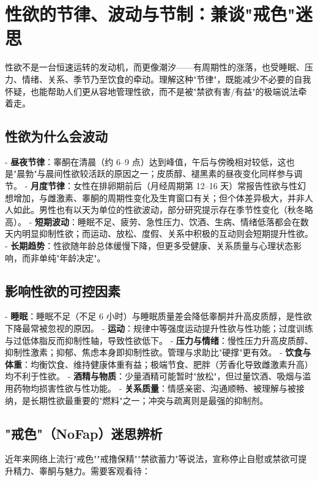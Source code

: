 \section{性欲的节律、波动与节制：兼谈"戒色"迷思}

性欲不是一台恒速运转的发动机，而更像潮汐——有周期性的涨落，也受睡眠、压力、情绪、关系、季节乃至饮食的牵动。理解这种"节律"，既能减少不必要的自我怀疑，也能帮助人们更从容地管理性欲，而不是被"禁欲有害/有益"的极端说法牵着走。

\subsection{性欲为什么会波动}

- \textbf{昼夜节律}：睾酮在清晨（约 6--9 点）达到峰值，午后与傍晚相对较低，这也是"晨勃"与晨间性欲较活跃的原因之一；皮质醇、褪黑素的昼夜变化同样参与调节。
- \textbf{月度节律}：女性在排卵期前后（月经周期第 12--16 天）常报告性欲与性幻想增加，与雌激素、睾酮的周期性变化及生育窗口有关；但个体差异极大，并非人人如此。男性也有以天为单位的性欲波动，部分研究提示存在季节性变化（秋冬略高）。
- \textbf{短期波动}：睡眠不足、疲劳、急性压力、饮酒、生病、情绪低落都会在数天内明显抑制性欲；而运动、放松、度假、关系中积极的互动则会短期提升性欲。
- \textbf{长期趋势}：性欲随年龄总体缓慢下降，但更多受健康、关系质量与心理状态影响，而非单纯"年龄决定"。

\subsection{影响性欲的可控因素}

- \textbf{睡眠}：睡眠不足（不足 6 小时）与睡眠质量差会降低睾酮并升高皮质醇，是性欲下降最常被忽视的原因。
- \textbf{运动}：规律中等强度运动提升性欲与性功能；过度训练与过低体脂反而抑制性轴，导致性欲低下。
- \textbf{压力与情绪}：慢性压力升高皮质醇、抑制性激素；抑郁、焦虑本身即抑制性欲。管理与求助比"硬撑"更有效。
- \textbf{饮食与体重}：均衡饮食、维持健康体重有益；极端节食、肥胖（芳香化导致雌激素升高）均不利于性欲。
- \textbf{酒精与物质}：少量酒精可能暂时"放松"，但过量饮酒、吸烟与滥用药物均损害性欲与性功能。
- \textbf{关系质量}：情感亲密、沟通顺畅、被理解与被接纳，是长期性欲最重要的"燃料"之一；冲突与疏离则是最强的抑制剂。

\subsection{"戒色"（NoFap）迷思辨析}

近年来网络上流行"戒色""戒撸保精""禁欲蓄力"等说法，宣称停止自慰或禁欲可提升精力、睾酮与魅力。需要客观看待：

